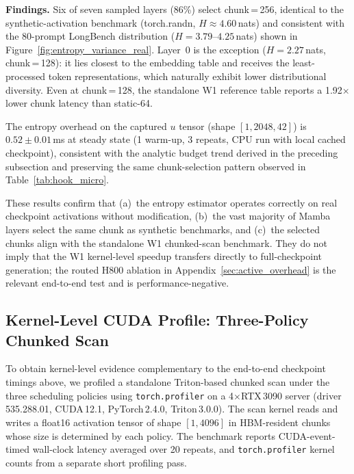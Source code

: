 \noindent\textbf{Findings.}
Six of seven sampled layers (86\%) select chunk\,=\,256, identical to the synthetic-activation benchmark (torch.randn, $H{\approx}4.60$\,nats) and consistent with the 80-prompt LongBench distribution ($H{=}3.79$--$4.25$\,nats) shown in Figure~\ref{fig:entropy_variance_real}.
Layer~0 is the exception ($H{=}2.27$\,nats, chunk\,=\,128): it lies closest to the embedding table and receives the least-processed token representations, which naturally exhibit lower distributional diversity.
Even at chunk\,=\,128, the standalone W1 reference table reports a 1.92$\times$ lower chunk latency than static-64.

The entropy overhead on the captured $u$ tensor (shape $[1,2048,42]$) is $0.52\pm0.01$\,ms at steady state (1 warm-up, 3 repeats, CPU run with local cached checkpoint), consistent with the analytic budget trend derived in the preceding subsection and preserving the same chunk-selection pattern observed in Table~\ref{tab:hook_micro}.

These results confirm that (a)~the entropy estimator operates correctly on real checkpoint activations without modification, (b)~the vast majority of Mamba layers select the same chunk as synthetic benchmarks, and (c)~the selected chunks align with the standalone W1 chunked-scan benchmark. They do not imply that the W1 kernel-level speedup transfers directly to full-checkpoint generation; the routed H800 ablation in Appendix~\ref{sec:active_overhead} is the relevant end-to-end test and is performance-negative.

\subsection{Kernel-Level CUDA Profile: Three-Policy Chunked Scan}
\label{sec:appendix_cuda_profile}

To obtain kernel-level evidence complementary to the end-to-end checkpoint timings above, we profiled a standalone Triton-based chunked scan under the three scheduling policies using \texttt{torch.profiler} on a 4$\times$RTX\,3090 server (driver 535.288.01, CUDA\,12.1, PyTorch\,2.4.0, Triton\,3.0.0).
The scan kernel reads and writes a float16 activation tensor of shape $[1, 4096]$ in HBM-resident chunks whose size is determined by each policy.
The benchmark reports CUDA-event-timed wall-clock latency averaged over 20 repeats, and \texttt{torch.profiler} kernel counts from a separate short profiling pass.

